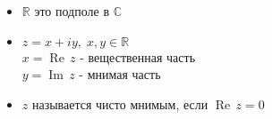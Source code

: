 \begin{itemize}
    \item $\mathbb{R}$ это подполе в $\mathbb{C}$ 
    \item $z = x + iy,\; x, y \in \mathbb{R}$ \\
    $x = \operatorname{Re}\,z$ - вещественная часть \\
    $y = \operatorname{Im}\,z$ - мнимая часть
    \item $z$ называется чисто мнимым, если $\operatorname{Re}\,z = 0$
\end{itemize}